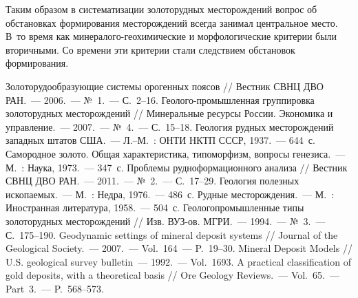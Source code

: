 Таким образом в систематизации золоторудных месторождений вопрос об обстановках формирования месторождений всегда занимал центральное место. В~то время как минералого-геохимические и морфологические критерии были вторичными. Со времени эти критерии стали следствием обстановок формирования.

\begin{thebibliography}{99}
\bibitem{} Золоторудообразующие системы орогенных поясов // Вестник СВНЦ ДВО РАН.~--- 2006.~--- №~1.~--- С.~2--16.
\bibitem{} Геолого-промышленная группировка золоторудных месторождений // Минеральные ресурсы России. Экономика и управление.~--- 2007.~--- №~4.~--- С.~15--18.
\bibitem{} Геология рудных месторождений западных штатов США.~--- Л.--М.~: ОНТИ НКТП СССР, 1937.~--- 644~с.
\bibitem{} Самородное золото. Общая характеристика, типоморфизм, вопросы генезиса.~--- М.~: Наука, 1973.~--- 347~с.
\bibitem{} Проблемы рудноформационного анализа // Вестник СВНЦ ДВО РАН.~--- 2011.~--- №~2.~--- С.~17--29.
\bibitem{} Геология полезных ископаемых.~--- М.~: Недра, 1976.~--- 486~с.
\bibitem{} Рудные месторождения.~--- М.~: Иностранная литература, 1958.~--- 504~с.
\bibitem{} Геологопромышленные типы золоторудных месторождений // Изв. ВУЗ-ов. МГРИ.~--- 1994.~--- №~3.~--- С.~175--190.
\bibitem{} Geodynamic settings of mineral deposit systems // Journal of the Geological Society.~--- 2007.~--- Vol.~164~--- P.~19--30.
\bibitem{} Mineral Deposit Models // U.S. geological survey bulletin~--- 1992.~--- Vol.~1693.
\bibitem{} A practical classification of gold deposits, with a theoretical basis // Ore Geology Reviews.~--- Vol.~65.~--- Part~3.~--- P.~568--573.
\end{thebibliography}
